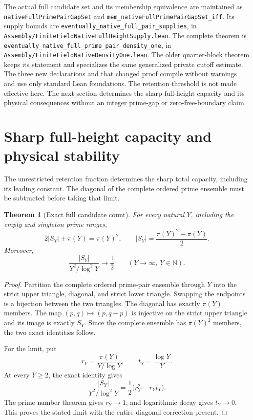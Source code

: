 \documentclass[11pt]{article}
\newtheorem{theorem}{Theorem}[section]
\begin{document}
The actual full candidate set and its membership equivalence are
maintained as \texttt{nativeFullPrimePairGapSet} and
\texttt{mem\_nativeFullPrimePairGapSet\_iff}.
Its supply bounds are
\texttt{eventually\_native\_full\_pair\_supplies}, in
\texttt{Assembly/\allowbreak FiniteFieldNativeFullHeightSupply.\allowbreak lean}.
The complete theorem is
\texttt{eventually\_native\_full\_prime\_pair\_density\_one}, in
\texttt{Assembly/\allowbreak FiniteFieldNativeDensityOne.\allowbreak lean}.
The older quarter-block theorem keeps its statement and specializes the
same generalized private cutoff estimate.
The three new declarations and that changed proof compile without
warnings and use only standard Lean foundations.
The retention threshold is not made effective here.
The next section determines the sharp full-height capacity and its
physical consequences without an integer prime-gap or zero-free-boundary
claim.

\section{Sharp full-height capacity and physical stability}
\label{sec:native-full-capacity}

The unrestricted retention fraction determines the sharp total capacity,
including its leading constant. The diagonal of the complete ordered
prime ensemble must be subtracted before taking that limit.

\begin{theorem}[Exact full candidate count]\label{thm:native-full-count}
For every natural \(Y\), including the empty and singleton prime ranges,
\[
 2|S_Y|+\pi(Y)=\pi(Y)^2,\qquad
 |S_Y|=\frac{\pi(Y)^2-\pi(Y)}2.
\]
Moreover,
\[
 \frac{|S_Y|}{Y^2/\log^2Y}\longrightarrow\frac12
 \qquad(Y\to\infty,\ Y\in\mathbb N).
\]
\end{theorem}

\begin{proof}
Partition the complete ordered prime-pair ensemble through \(Y\) into
the strict upper triangle, diagonal, and strict lower triangle.
Swapping the endpoints is a bijection between the two triangles.
The diagonal has exactly \(\pi(Y)\) members. The map
\((p,q)\mapsto(p,q-p)\) is injective on the strict upper triangle
and its image is exactly \(S_Y\). Since the complete ensemble has
\(\pi(Y)^2\) members, the two exact identities follow.

For the limit, put
\[
 r_Y=\frac{\pi(Y)}{Y/\log Y},\qquad
 t_Y=\frac{\log Y}{Y}.
\]
At every \(Y\ge2\), the exact identity gives
\[
 \frac{|S_Y|}{Y^2/\log^2Y}
   =\frac12\bigl(r_Y^2-r_Yt_Y\bigr).
\]
The prime number theorem gives \(r_Y\to1\), and logarithmic decay
gives \(t_Y\to0\). This proves the stated limit with the entire
diagonal correction present.
\end{proof}
\end{document}
